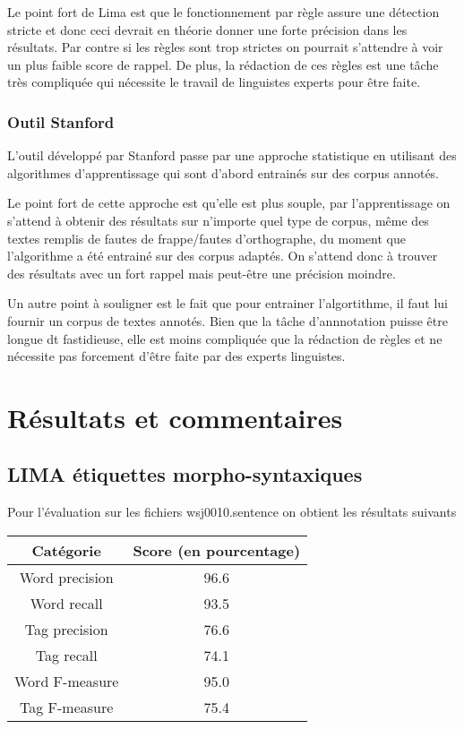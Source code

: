 \documentclass[12pt]{report}
\begin{document}
Le point fort de Lima est que le fonctionnement par règle assure une détection stricte et donc ceci devrait en théorie donner une forte précision dans les résultats. Par contre si les règles sont trop strictes on pourrait s'attendre à voir un plus faible score de rappel. De plus, la rédaction de ces règles est une tâche très compliquée qui nécessite le travail de linguistes experts pour être faite.

\subsubsection{Outil Stanford}
L'outil développé par Stanford passe par une approche statistique en utilisant des algorithmes d'apprentissage qui sont d'abord entrainés sur des corpus annotés. 

Le point fort de cette approche est qu'elle est plus souple, par l'apprentissage on s'attend à obtenir des résultats sur n'importe quel type de corpus, même des textes remplis de fautes de frappe/fautes d'orthographe, du moment que l'algorithme a été entrainé sur des corpus adaptés. On s'attend donc à trouver des résultats avec un fort rappel mais peut-être une précision moindre.

Un autre point à souligner est le fait que pour entrainer l'algortithme, il faut lui fournir un corpus de textes annotés. Bien que la tâche d'annnotation puisse être longue dt fastidieuse, elle est moins compliquée que la rédaction de règles et ne nécessite pas forcement d'être faite par des experts linguistes.




\newpage
\section{Résultats et commentaires}
\subsection{LIMA étiquettes morpho-syntaxiques}

Pour l'évaluation sur les fichiers wsj0010.sentence on obtient les résultats suivants

\begin{tabular}{c c}
\hline
  Catégorie & Score (en pourcentage) \\
\hline
    Word precision & 96.6 \\
    Word recall & 93.5 \\
    Tag precision & 76.6 \\
    Tag recall & 74.1 \\
    Word F-measure & 95.0 \\
    Tag F-measure & 75.4 \\
    
\end{tabular}
\end{document}
